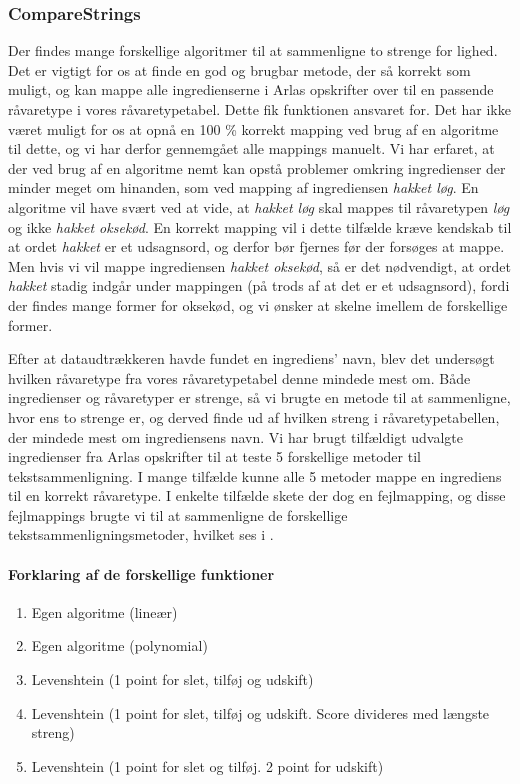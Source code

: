 \subsubsection{CompareStrings}
Der findes mange forskellige algoritmer til at sammenligne to strenge for lighed. Det er vigtigt for os at finde en god og brugbar metode, der så korrekt som muligt, og kan mappe alle ingredienserne i Arlas opskrifter over til en passende råvaretype i vores råvaretypetabel. Dette fik funktionen  ansvaret for. Det har ikke været muligt for os at opnå en 100 \% korrekt mapping ved brug af en algoritme til dette, og vi har derfor gennemgået alle mappings manuelt. Vi har erfaret, at der ved brug af en algoritme nemt kan opstå problemer omkring ingredienser der minder meget om hinanden, som \fx ved mapping af ingrediensen \textit{hakket løg}. En algoritme vil have svært ved at vide, at \textit{hakket løg} skal mappes til råvaretypen \textit{løg} og ikke \textit{hakket oksekød}. En korrekt mapping vil i dette tilfælde kræve kendskab til at ordet \textit{hakket} er et udsagnsord, og derfor bør fjernes før der forsøges at mappe. Men hvis vi vil mappe ingrediensen \textit{hakket oksekød}, så er det nødvendigt, at ordet \textit{hakket} stadig indgår under mappingen (på trods af at det er et udsagnsord), fordi der findes mange former for oksekød, og vi ønsker at skelne imellem de forskellige former.

Efter at dataudtrækkeren havde fundet en ingrediens' navn, blev det undersøgt hvilken råvaretype fra vores råvaretypetabel denne mindede mest om. Både ingredienser og råvaretyper er strenge, så vi brugte en metode til at sammenligne, hvor ens to strenge er, og derved finde ud af hvilken streng i råvaretypetabellen, der mindede mest om ingrediensens navn.
Vi har brugt tilfældigt udvalgte ingredienser fra Arlas opskrifter til at teste 5 forskellige metoder til tekstsammenligning. I mange tilfælde kunne alle 5 metoder mappe en ingrediens til en korrekt råvaretype. I enkelte tilfælde skete der dog en fejlmapping, og disse fejlmappings brugte vi til at sammenligne de forskellige tekstsammenligningsmetoder, hvilket ses i .

\paragraph{Forklaring af de forskellige  funktioner}
\begin{enumerate}[noitemsep]
  \item Egen algoritme (lineær)
  \item Egen algoritme (polynomial)
  \item Levenshtein (1 point for slet, tilføj og udskift)\cite{rubygemlevenshtein}
  \item Levenshtein (1 point for slet, tilføj og udskift. Score divideres med længste streng)\cite{rubygemlevenshtein}
  \item Levenshtein (1 point for slet og tilføj. 2 point for udskift)\cite{rubygemlevenshtein}
\end{enumerate}


